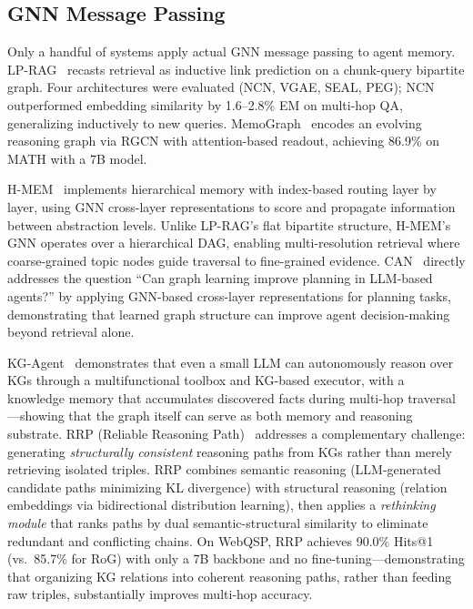 \documentclass[hf]{ceurart}
\begin{document}
\subsection{GNN Message Passing}

Only a handful of systems apply actual GNN message passing to agent
memory. LP-RAG~\cite{lprag2026} recasts retrieval as inductive link
prediction on a chunk-query bipartite graph. Four architectures were
evaluated (NCN, VGAE, SEAL, PEG); NCN outperformed embedding
similarity by 1.6--2.8\% EM on multi-hop QA, generalizing inductively
to new queries. MemoGraph~\cite{memograph2026} encodes an evolving
reasoning graph via RGCN with attention-based readout, achieving 86.9\%
on MATH with a 7B model.

H-MEM~\cite{hmem2025} implements hierarchical memory with
index-based routing layer by layer, using GNN cross-layer
representations to score and propagate information between abstraction
levels. Unlike LP-RAG's flat bipartite structure, H-MEM's GNN operates
over a hierarchical DAG, enabling multi-resolution retrieval where
coarse-grained topic nodes guide traversal to fine-grained evidence.
CAN~\cite{can2024} directly addresses the question ``Can graph learning
improve planning in LLM-based agents?'' by applying GNN-based
cross-layer representations for planning tasks, demonstrating that
learned graph structure can improve agent decision-making beyond
retrieval alone.

KG-Agent~\cite{kgagent2024} demonstrates that even a small LLM can
autonomously reason over KGs through a multifunctional toolbox and
KG-based executor, with a knowledge memory that accumulates discovered
facts during multi-hop traversal---showing that the graph itself can
serve as both memory and reasoning substrate.
RRP (Reliable Reasoning Path)~\cite{rrp2025} addresses a complementary
challenge: generating \emph{structurally consistent} reasoning paths
from KGs rather than merely retrieving isolated triples. RRP combines
semantic reasoning (LLM-generated candidate paths minimizing KL
divergence) with structural reasoning (relation embeddings via
bidirectional distribution learning), then applies a \emph{rethinking
module} that ranks paths by dual semantic-structural similarity to
eliminate redundant and conflicting chains. On WebQSP, RRP achieves
90.0\% Hits@1 (vs.\ 85.7\% for RoG) with only a 7B backbone and no
fine-tuning---demonstrating that organizing KG relations into coherent
reasoning paths, rather than feeding raw triples, substantially
improves multi-hop accuracy.
\end{document}
